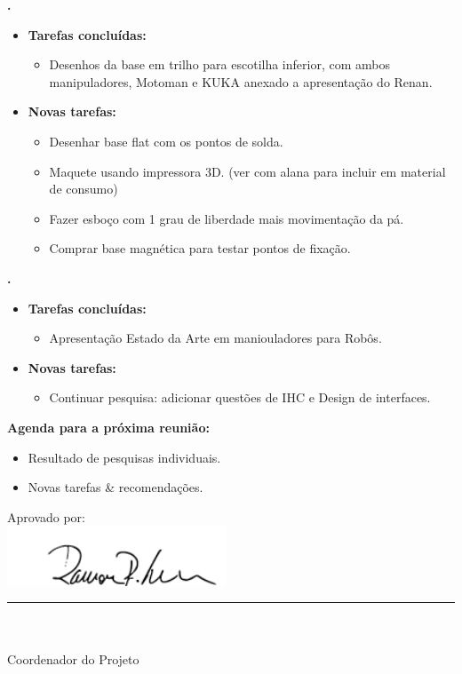 			
\textbf{.} 
	\begin{itemize}
		\item \textbf{Tarefas concluídas:}
			\begin{itemize}    
				\item Desenhos da base em trilho para escotilha inferior, com ambos
				manipuladores, Motoman e KUKA anexado a apresentação do Renan.
			\end{itemize}
		
		\item \textbf{Novas tarefas:}
			\begin{itemize} 
				\item Desenhar base flat com os pontos de solda.
				\item Maquete usando impressora 3D. (ver com alana para incluir em material
				de consumo)
				\item Fazer esboço com 1 grau de liberdade mais movimentação da pá.
				\item Comprar base magnética para testar pontos de fixação.
			\end{itemize}
	\end{itemize}
	
		
   \textbf{\julia.} 
	\begin{itemize}
		\item \textbf{Tarefas concluídas:}
			\begin{itemize}    
				\item Apresentação Estado da Arte em maniouladores para Robôs.
			\end{itemize}
		
		\item \textbf{Novas tarefas:}
			\begin{itemize} 
			 \item Continuar pesquisa: adicionar questões de IHC e Design de interfaces.
			\end{itemize}
	\end{itemize}


\textbf{Agenda para a próxima reunião:}
  \begin{itemize}
    \item Resultado de pesquisas individuais. 
    \item Novas tarefas \& recomendações.
  \end{itemize}


\vspace{5mm}%
\parbox[t]{70mm}{
  Aprovado por: \\[5mm]
  \centering
  \includegraphics[width=65mm]{figs/logo/assinatura-ramon.png} \\[-4mm]
  \rule[2mm]{70mm}{0.1mm} \\
  \ramon \\[1mm]
  Coordenador do Projeto \\
}

\fim